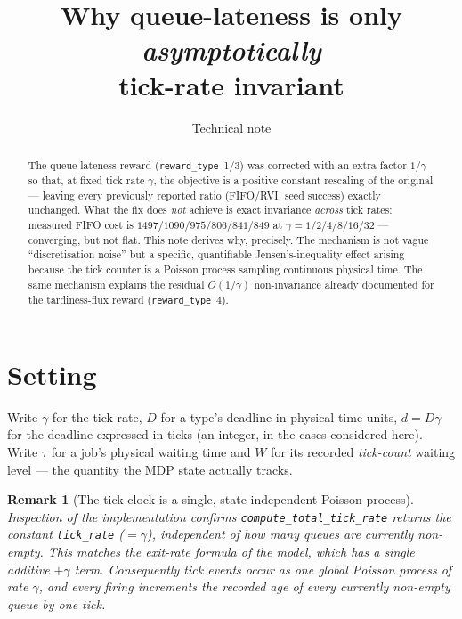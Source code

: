 \documentclass[11pt,a4paper]{article}
\title{Why queue-lateness is only \emph{asymptotically}\\tick-rate invariant}
\author{Technical note}
\date{}
\newtheorem{remark}{Remark}
\begin{document}
\maketitle

\begin{abstract}
The queue-lateness reward (\texttt{reward\_type}~1/3) was corrected with an
extra factor $1/\gamma$ so that, at fixed tick rate $\gamma$, the objective is
a positive constant rescaling of the original --- leaving every previously
reported ratio (FIFO/RVI, seed success) exactly unchanged.  What the fix does
\emph{not} achieve is exact invariance \emph{across} tick rates: measured FIFO
cost is $1497 / 1090 / 975 / 806 / 841 / 849$ at
$\gamma = 1/2/4/8/16/32$ --- converging, but not flat.  This note derives why,
precisely.  The mechanism is not vague ``discretisation noise'' but a specific,
quantifiable Jensen's-inequality effect arising because the tick counter is a
Poisson process sampling continuous physical time.  The same mechanism
explains the residual $O(1/\gamma)$ non-invariance already documented for the
tardiness-flux reward (\texttt{reward\_type}~4).
\end{abstract}

\tableofcontents

\section{Setting}

Write $\gamma$ for the tick rate, $D$ for a type's deadline in physical time
units, $d = D\gamma$ for the deadline expressed in ticks (an integer, in the
cases considered here).  Write $\tau$ for a job's physical waiting time and
$W$ for its recorded \emph{tick-count} waiting level --- the quantity the MDP
state actually tracks.

\begin{remark}[The tick clock is a single, state-independent Poisson process]
Inspection of the implementation confirms
\texttt{compute\_total\_tick\_rate} returns the constant \texttt{tick\_rate}
($=\gamma$), independent of how many queues are currently non-empty.  This
matches the exit-rate formula of the model, which has a single additive
$+\gamma$ term.  Consequently tick events occur as one global Poisson process
of rate $\gamma$, and every firing increments the recorded age of \emph{every}
currently non-empty queue by one tick.
\end{remark}
\end{document}
